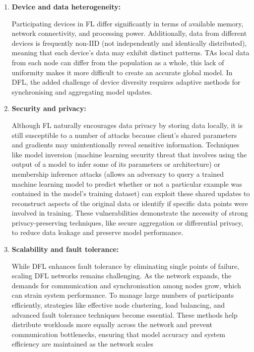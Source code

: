 \begin{enumerate}
	\item \textbf{Device and data heterogeneity:}
	
	Participating devices in \gls{FL} differ significantly in terms of available memory, network connectivity, and processing power. Additionally, data from different devices is frequently non-IID (not independently and identically distributed), meaning that each device's data may exhibit distinct patterns. TAs local data from each node can differ from the population as a whole, this lack of uniformity makes it more difficult to create an accurate global model. In \gls{DFL}, the added challenge of device diversity requires adaptive methods for synchronising and aggregating model updates. ​
	\item \textbf{Security and privacy:}
	
	Although FL naturally encourages data privacy by storing data locally, it is still susceptible to a number of attacks because client’s shared parameters and gradients may unintentionally reveal sensitive information. Techniques like model inversion (machine learning security threat that involves using the output of a model to infer some of its parameters or architecture) or membership inference attacks (allows an adversary to query a trained machine learning model to predict whether or not a particular example was contained in the model's training dataset) can exploit these shared updates to reconstruct aspects of the original data or identify if specific data points were involved in training. These vulnerabilities demonstrate the necessity of strong privacy-preserving techniques, like secure aggregation or differential privacy, to reduce data leakage and preserve model performance.
	\item \textbf{Scalability and fault tolerance:} 
	
	While DFL enhances fault tolerance by eliminating single points of failure, scaling DFL networks remains challenging. As the network expands, the demands for communication and synchronisation among nodes grow, which can strain system performance. To manage large numbers of participants efficiently, strategies like effective node clustering, load balancing, and advanced fault tolerance techniques become essential. These methods help distribute workloads more equally across the network and prevent communication bottlenecks, ensuring that model accuracy and system efficiency are maintained as the network scales

\end{enumerate}

